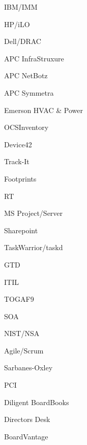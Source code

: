 \documentclass[letterpaper,10pt,final]{memoir}
\begin{document}
{{
\begin{multicols}{4}
\begin{compactitem}[\color{Black}$\bullet$]
\item IBM/IMM
\item HP/iLO
\item Dell/DRAC
\item APC InfraStruxure
\item APC NetBotz
\item APC Symmetra
\item Emerson HVAC \& Power
\end{compactitem}
\end{multicols}
\SmallSep

\begin{multicols}{4}
\begin{compactitem}[\color{Black}$\bullet$]
\item OCSInventory
\item Device42
\item Track-It
\item Footprints
\item RT
\item MS Project/Server
\item Sharepoint
\item TaskWarrior/taskd
\end{compactitem}
\end{multicols}
\SmallSep

\begin{multicols}{4}
\begin{compactitem}[\color{Black}$\bullet$]
\item GTD
\item ITIL
\item TOGAF9
\item SOA
\item NIST/NSA
\item Agile/Scrum
\end{compactitem}
\end{multicols}
\SmallSep

\begin{multicols}{4}
\begin{compactitem}[\color{Black}$\bullet$]
\item Sarbanes-Oxley
\item PCI
\item Diligent BoardBooks
\item Directors Desk
\item BoardVantage
\end{compactitem}
\end{multicols}
\SmallSep

}}
\end{document}
